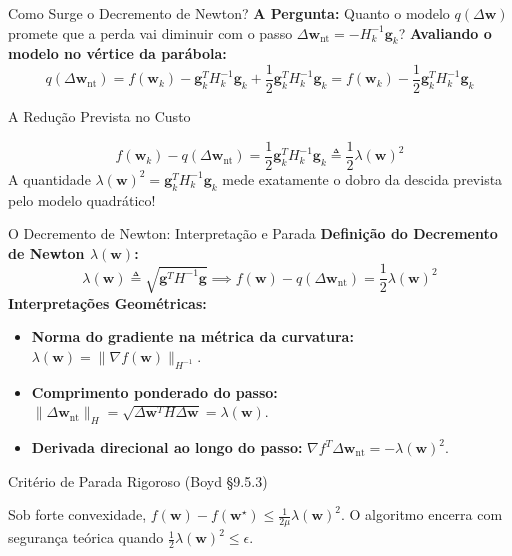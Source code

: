 \documentclass[aspectratio=169, 10pt]{beamer}
\newenvironment{callouttip}[1][Dica]{%
  \begin{exampleblock}{#1}%
}{%
  \end{exampleblock}%
}
\newenvironment{calloutimportant}[1][Importante]{%
  \begin{alertblock}{#1}%
}{%
  \end{alertblock}%
}
\begin{document}
\begin{frame}{Como Surge o Decremento de Newton?}
  \textbf{A Pergunta:} Quanto o modelo $q(\Delta\mathbf{w})$ promete que a perda vai diminuir com o passo $\Delta\mathbf{w}_{\text{nt}} = -H_k^{-1}\mathbf{g}_k$?
  \vspace{0.2cm}
  \textbf{Avaliando o modelo no vértice da parábola:}
  \[q(\Delta\mathbf{w}_{\text{nt}}) = f(\mathbf{w}_k) - \mathbf{g}_k^T H_k^{-1}\mathbf{g}_k + \frac{1}{2}\mathbf{g}_k^T H_k^{-1}\mathbf{g}_k = f(\mathbf{w}_k) - \frac{1}{2}\mathbf{g}_k^T H_k^{-1}\mathbf{g}_k\]
  \vspace{0.3cm}
  \begin{calloutimportant}[A Redução Prevista no Custo]
    \[f(\mathbf{w}_k) - q(\Delta\mathbf{w}_{\text{nt}}) = \frac{1}{2} \mathbf{g}_k^T H_k^{-1} \mathbf{g}_k \triangleq \frac{1}{2} \lambda(\mathbf{w})^2\]
    A quantidade $\lambda(\mathbf{w})^2 = \mathbf{g}_k^T H_k^{-1} \mathbf{g}_k$ mede exatamente o dobro da descida prevista pelo modelo quadrático!
  \end{calloutimportant}
\end{frame}

\begin{frame}{O Decremento de Newton: Interpretação e Parada}
  \textbf{Definição do Decremento de Newton $\lambda(\mathbf{w})$:}
  \[\lambda(\mathbf{w}) \triangleq \sqrt{\mathbf{g}^T H^{-1} \mathbf{g}} \implies f(\mathbf{w}) - q(\Delta\mathbf{w}_{\text{nt}}) = \frac{1}{2}\lambda(\mathbf{w})^2\]
  \vspace{0.2cm}
  \textbf{Interpretações Geométricas:}
  \begin{itemize}
    \item \textbf{Norma do gradiente na métrica da curvatura:} $\lambda(\mathbf{w}) = \|\nabla f(\mathbf{w})\|_{H^{-1}}$.
    \item \textbf{Comprimento ponderado do passo:} $\|\Delta\mathbf{w}_{\text{nt}}\|_H = \sqrt{\Delta\mathbf{w}^T H \Delta\mathbf{w}} = \lambda(\mathbf{w})$.
    \item \textbf{Derivada direcional ao longo do passo:} $\nabla f^T \Delta\mathbf{w}_{\text{nt}} = -\lambda(\mathbf{w})^2$.
  \end{itemize}
  \vspace{0.2cm}
  \begin{callouttip}[Critério de Parada Rigoroso (Boyd §9.5.3)]
    Sob forte convexidade, $f(\mathbf{w}) - f(\mathbf{w}^\star) \le \frac{1}{2\mu}\lambda(\mathbf{w})^2$.
    O algoritmo encerra com segurança teórica quando $\frac{1}{2}\lambda(\mathbf{w})^2 \le \epsilon$.
  \end{callouttip}
\end{frame}
\end{document}
